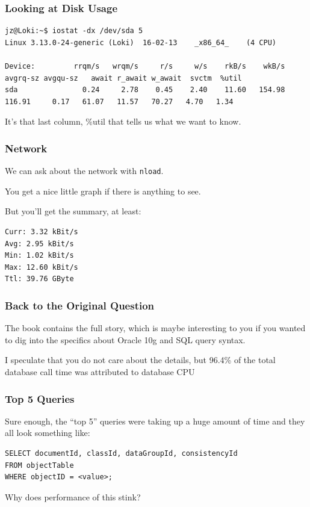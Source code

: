 \begin{frame}[fragile]
\frametitle{Looking at Disk Usage}

{\tiny
\begin{verbatim}
jz@Loki:~$ iostat -dx /dev/sda 5 
Linux 3.13.0-24-generic (Loki) 	16-02-13 	_x86_64_	(4 CPU)

Device:         rrqm/s   wrqm/s     r/s     w/s    rkB/s    wkB/s avgrq-sz avgqu-sz   await r_await w_await  svctm  %util
sda               0.24     2.78    0.45    2.40    11.60   154.98   116.91     0.17   61.07   11.57   70.27   4.70   1.34
\end{verbatim}
}

It's that last column, \%util that tells us what we want to know.

\end{frame}



\begin{frame}[fragile]
\frametitle{Network}

We can ask about the network with \texttt{nload}. 
 
You get a nice little graph if there is anything to see. 

But you'll get the summary, at least:

\begin{verbatim}
Curr: 3.32 kBit/s
Avg: 2.95 kBit/s
Min: 1.02 kBit/s
Max: 12.60 kBit/s
Ttl: 39.76 GByte                                                                                       \end{verbatim}

\end{frame}



\begin{frame}
\frametitle{Back to the Original Question}

The book contains the full story, which is maybe interesting to you if you wanted to dig into the specifics about Oracle 10g and SQL query syntax. 

I speculate that you do not care about the details, but 96.4\% of the total database call time was attributed to database CPU


\end{frame}



\begin{frame}[fragile]
\frametitle{Top 5 Queries}

Sure enough, the ``top 5'' queries were taking up a huge amount of time and they all look something like:

\begin{verbatim}
SELECT documentId, classId, dataGroupId, consistencyId 
FROM objectTable 
WHERE objectID = <value>;
\end{verbatim}

Why does performance of this stink?

\end{frame}



